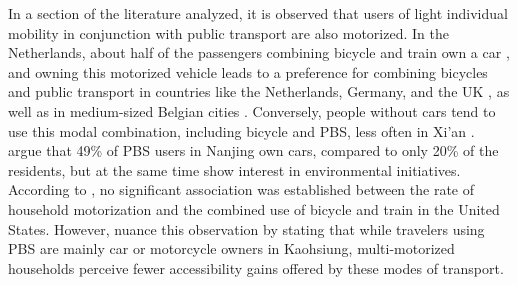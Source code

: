 \begin{refsegment}
In a section of the literature analyzed, it is observed that users of light individual mobility in conjunction with public transport are also motorized. In the Netherlands, about half of the passengers combining bicycle and train own a car \textcolor{blue}{\autocite[362]{givoni_access_2007}}, and owning this motorized vehicle leads to a preference for combining bicycles and public transport in countries like the Netherlands, Germany, and the UK \textcolor{blue}{\autocite[289]{martens_bicycle_2004}}, as well as in medium-sized Belgian cities \textcolor{blue}{\autocite[6]{adnan_last-mile_2019}}. Conversely, people without cars tend to use this modal combination, including bicycle and \acrshort{PBS}, less often in Xi'an \textcolor{blue}{\autocite[172]{yang_bike-and-ride_2014}}. \textcolor{blue}{\textcite[7]{yang_empirical_2016}} argue that 49\% of \acrshort{PBS} users in Nanjing own cars, compared to only 20\% of the residents, but at the same time show interest in environmental initiatives. According to \textcolor{blue}{\textcite[115]{wang_bicycle-transit_2013}}, no significant association was established between the rate of household motorization and the combined use of bicycle and train in the United States. However, \textcolor{blue}{\textcite[22]{cheng_expanding_2018}} nuance this observation by stating that while travelers using \acrshort{PBS} are mainly car or motorcycle owners in Kaohsiung, multi-motorized households perceive fewer accessibility gains offered by these modes of transport.%


\end{refsegment}
